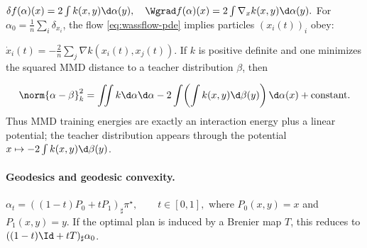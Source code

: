 \(\delta f(\alpha)(x) = 2 \int k(x, y) \d \alpha(y), \quad \Wgrad f(\alpha)(x) = 2 \int \nabla_x k(x, y) \d \alpha(y).\)
For $\alpha_0 = \frac{1}{n} \sum_i \delta_{x_i}$, the flow \eqref{eq:wassflow-pde} implies particles $(x_i(t))_i$ obey:

\(\dot{x}_i(t) = -\frac{2}{n} \sum_j \nabla k(x_i(t), x_j(t)).\)
If $k$ is positive definite and one minimizes the squared MMD distance to a teacher distribution $\beta$, then

\[
\norm{\alpha-\beta}_k^2
=
\iint k\d\alpha\d\alpha
-2\int\!\left(\int k(x,y)\d\beta(y)\right)\d\alpha(x)
+\mathrm{constant}.
\]
Thus MMD training energies are exactly an interaction energy plus a linear potential; the teacher distribution appears through the potential $x\mapsto-2\int k(x,y)\d\beta(y)$.

\paragraph{Geodesics and geodesic convexity.}
\label{sec-geodesic-convexity}
\(\alpha_t=((1-t)P_0+tP_1)_\sharp\pi^\star, \qquad t\in[0,1],\)
where $P_0(x,y)=x$ and $P_1(x,y)=y$. If the optimal plan is induced by a Brenier map $T$, this reduces to $((1-t)\Id+tT)_\sharp\alpha_0$.

